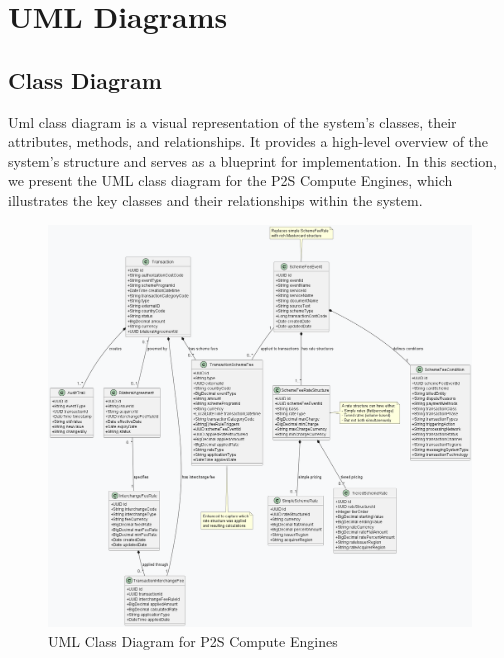     
    
    




\section{UML Diagrams}
\subsection{Class Diagram}

Uml class diagram is a visual representation of the system's classes, their attributes, methods, and relationships. It provides a high-level overview of the system's structure and serves as a blueprint for implementation.
In this section, we present the UML class diagram for the P2S Compute Engines, which illustrates the key classes and their relationships within the system.

\begin{figure}[H]
    \centering
    \includegraphics[width=1.05\textwidth]{out/diagrams/plantuml/in/class-diagram/class-diagram.png}
    \caption{UML Class Diagram for P2S Compute Engines}
    \label{fig:class_diagram}
\end{figure}




